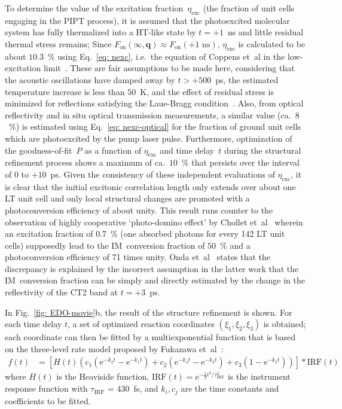 To determine the value of the excitation fraction~$\eta_\text{exc}$
(the fraction of unit cells engaging in the PIPT process),
it is assumed that the photoexcited molecular system has fully thermalized into a HT-like state
by $t = +1$~ns and little residual thermal stress remains;
Since $F_\text{on}(\infty, \boldsymbol{q}) \approx F_\text{on}(+1 \text{ ns})$,
$\eta_\text{exc}$ is calculated to be about $10.3$~\% using Eq.~\eqref{eq: nexc},
i.e.~the equation of Coppens et~al in the low-excitation limit~\cite{CoppensBook, Coppens1998, Coppens2005}.
%
These are fair assumptions to be made here, considering that the acoustic oscillations have damped away by $t > +500$~ps,
the estimated temperature increase is less than $50$~K, and the effect of residual stress is minimized
for reflections satisfying the Laue-Bragg condition~\cite{Harb2009}.
%
Also, from optical reflectivity and in situ optical transmission measurements,
a similar value (ca.~$8$~\%) is estimated using Eq.~\eqref{eq: nexc-optical}
for the fraction of ground unit cells which are photoexcited by the pump laser pulse.
%
Furthermore, optimization of the goodness-of-fit~$P$ as a function of $\eta_\text{exc}$ and
time delay~$t$ during the structural refinement process shows a maximum of ca.~$10$~\%
that persists over the interval of 0 to $+10$~ps.
%
Given the consistency of these independent evaluations of $\eta_\text{exc}$,
it is clear that the initial excitonic correlation length only extends over about one LT unit cell
and only local structural changes are promoted with a photoconversion efficiency of about unity.
%
This result runs counter to the observation of highly cooperative `photo-domino effect' by
Chollet et~al~\cite{Chollet2004} wherein an excitation fraction of $0.7$~\%
(one absorbed photons for every 142 LT unit cells) supposedly lead to the IM~conversion fraction of $50$~\% and
a photoconversion efficiency of 71 times unity.
%
Onda et~al~\cite{Onda2014} states that the discrepancy is explained by
the incorrect assumption in the latter work that the IM~conversion fraction can be simply and directly estimated by
the change in the reflectivity of the CT2 band at $t = +3$~ps.

In Fig.~\ref{fig: EDO-movie}b, the result of the structure refinement is shown.
For each time delay $t$, a set of optimized reaction coordinates $(\xi_1, \xi_2, \xi_3)$ is obtained;
each coordinate can then be fitted by a multiexponential function
that is based on the three-level rate model
proposed by Fukazawa et~al~\cite{Fukazawa2012}:
%
\begin{equation}
  \begin{aligned}
    f(t) & =
      \left[ H(t) \left(
        c_1 \left( \mathrm{e}^{-k_2 t} - \mathrm{e}^{-k_1 t} \right) +
        c_2 \left( \mathrm{e}^{-k_4 t} - \mathrm{e}^{-k_3 t} \right) +
        c_3 \left( 1 - \mathrm{e}^{-k_5 t} \right)
        \right) \right] \ast \text{IRF}(t)
  \end{aligned}
\end{equation}
%
where $H(t)$ is the Heaviside function,
$\textrm{IRF}(t) = \mathrm{e}^{- \frac{1}{2} t^2/\tau_\text{IRF}^2}$ is
the instrument response function with $\tau_\text{IRF}$ = $430$~fs, and
$k_i, c_j$ are the time constants and coefficients to be fitted.

